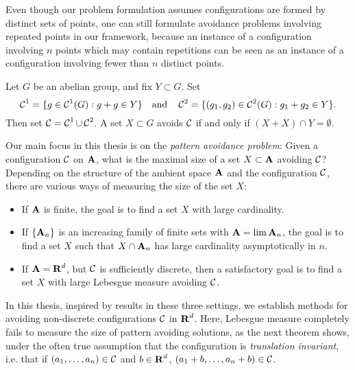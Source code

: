 Even though our problem formulation assumes configurations are formed by distinct sets of points, one can still formulate avoidance problems involving repeated points in our framework, because an instance of a configuration involving $n$ points which may contain repetitions can be seen as an instance of a configuration involving fewer than $n$ distinct points.

\begin{example}
	Let $G$ be an abelian group, and fix $Y \subset G$. Set
	\[ \operatorname{\mathcal{C}}^1 = \{ g \in \operatorname{\mathcal{C}}^1(G): g + g \in Y \} \quad \text{and} \quad \operatorname{\mathcal{C}}^2 = \{ (g_1,g_2) \in \operatorname{\mathcal{C}}^2(G): g_1 + g_2 \in Y \}. \]
	Then set $\operatorname{\mathcal{C}} = \operatorname{\mathcal{C}}^1 \cup \operatorname{\mathcal{C}}^2$. A set $X \subset G$ avoids $\operatorname{\mathcal{C}}$ if and only if $(X + X) \cap Y = \emptyset$.
\end{example}

Our main focus in this thesis is on the {\it pattern avoidance problem}: Given a configuration $\operatorname{\mathcal{C}}$ on $\operatorname{\mathbf{A}}$, what is the maximal size of a set $X \subset \operatorname{\mathbf{A}}$ avoiding $\operatorname{\mathcal{C}}$? Depending on the structure of the ambient space $\operatorname{\mathbf{A}}$ and the configuration $\operatorname{\mathcal{C}}$, there are various ways of measuring the size of the set $X$:
%
\begin{itemize}
	\item If $\operatorname{\mathbf{A}}$ is finite, the goal is to find a set $X$ with large cardinality.
	\item If $\{ \operatorname{\mathbf{A}}_n \}$ is an increasing family of finite sets with $\operatorname{\mathbf{A}} = \lim \operatorname{\mathbf{A}}_n$, the goal is to find a set $X$ such that $X \cap \operatorname{\mathbf{A}}_n$ has large cardinality asymptotically in $n$.
	\item If $\operatorname{\mathbf{A}} = \operatorname{\mathbf{R}}^d$, but $\operatorname{\mathcal{C}}$ is sufficiently discrete, then a satisfactory goal is to find a set $X$ with large Lebesgue measure avoiding $\operatorname{\mathcal{C}}$.
\end{itemize}
%
In this thesis, inspired by results in these three settings, we establish methods for avoiding non-discrete configurations $\operatorname{\mathcal{C}}$ in $\operatorname{\mathbf{R}}^d$. Here, Lebesgue measure completely fails to measure the size of pattern avoiding solutions, as the next theorem shows, under the often true assumption that the configuration is \emph{translation invariant}, i.e. that if $(a_1, \dots, a_n) \in \operatorname{\mathcal{C}}$ and $b \in \operatorname{\mathbf{R}}^d$, $(a_1 + b, \dots, a_n + b) \in \operatorname{\mathcal{C}}$.

